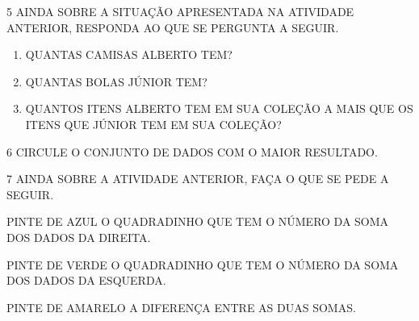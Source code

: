 

\num{5} AINDA SOBRE A SITUAÇÃO APRESENTADA NA ATIVIDADE ANTERIOR, RESPONDA AO QUE SE PERGUNTA A SEGUIR.

\begin{enumerate}
\item
  QUANTAS CAMISAS ALBERTO TEM? 

\item
  QUANTAS BOLAS JÚNIOR TEM? 

\item
  QUANTOS ITENS ALBERTO TEM EM SUA COLEÇÃO A MAIS QUE OS ITENS QUE JÚNIOR TEM EM SUA COLEÇÃO?

\end{enumerate}

\num{6} CIRCULE O CONJUNTO DE DADOS COM O MAIOR RESULTADO.




\num{7} AINDA SOBRE A ATIVIDADE ANTERIOR, FAÇA O QUE SE PEDE A SEGUIR.

\begin{escolha}
\item PINTE DE AZUL O QUADRADINHO QUE TEM O NÚMERO DA SOMA DOS DADOS DA DIREITA.

\item PINTE DE VERDE O QUADRADINHO QUE TEM O NÚMERO DA SOMA DOS DADOS DA ESQUERDA.

\item PINTE DE AMARELO A DIFERENÇA ENTRE AS DUAS SOMAS.
\end{escolha}

